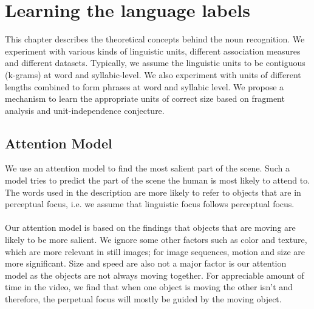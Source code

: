 \documentclass[12pt, a4paper]{report}
\begin{document}
\chapter{Learning the language labels}
This chapter describes the theoretical concepts behind the noun recognition. We experiment with various kinds of linguistic units, different association measures and different datasets. Typically, we assume the linguistic units to be contiguous (k-grams) at word and syllabic-level. We also experiment with units of different lengths combined to form phrases at word and syllabic level. We propose a mechanism to learn the appropriate units of correct size based on fragment analysis and unit-independence conjecture.

\section{Attention Model}
We use an attention model to find the most salient part of the scene. Such a model tries to predict the part of the scene the human is most likely to attend to. The words used in the description are more likely to refer to objects that are in perceptual focus, i.e. we assume that linguistic focus follows perceptual focus.\\
\\
Our attention model is based on the findings that objects that are moving are likely to be more salient. We ignore some other factors such as color and texture, which are more relevant in still images; for image sequences, motion and size are more significant. Size and speed are also not a major factor is our attention model as the objects are not always moving together. For appreciable amount of time in the video, we find that when one object is moving the other isn’t and therefore, the perpetual focus will mostly be guided by the moving object.
\end{document}

